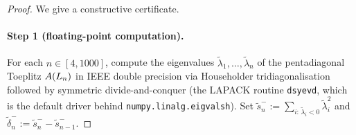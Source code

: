\begin{proof}
We give a constructive certificate.

\paragraph{Step 1 (floating-point computation).}
For each $n \in [4, 1000]$, compute the eigenvalues
$\tilde\lambda_{1}, \ldots, \tilde\lambda_{n}$ of the pentadiagonal
Toeplitz $A(L_{n})$ in IEEE double precision via Householder
tridiagonalisation followed by symmetric divide-and-conquer (the
LAPACK routine \texttt{dsyevd}, which is the default driver behind
\texttt{numpy.linalg.eigvalsh}). Set
$\tilde s_{n}^{-} := \sum_{i:\, \tilde\lambda_{i} < 0} \tilde\lambda_{i}^{2}$
and $\tilde\delta_{n}^{-} := \tilde s_{n}^{-} - \tilde s_{n-1}^{-}$.


\end{proof}

